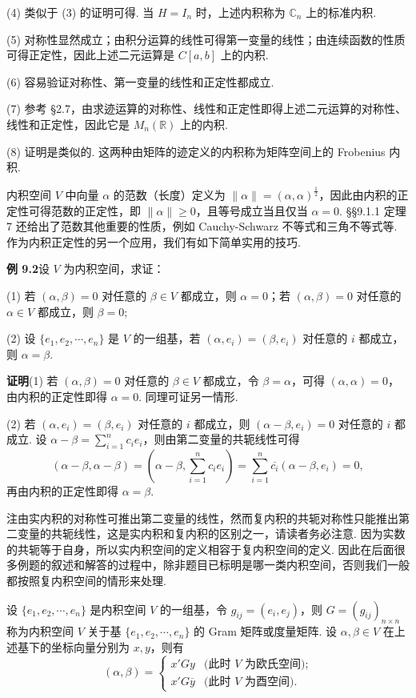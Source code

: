 \documentclass[UTF8,12pt,a4paper,fontset=fandol]{ctexart}
\begin{document}
(4) 类似于 (3) 的证明可得. 当 $H=I_n$ 时，上述内积称为 $\mathbb{C}_n$ 上的标准内积.

(5) 对称性显然成立；由积分运算的线性可得第一变量的线性；由连续函数的性质可得正定性，因此上述二元运算是 $C[a,b]$ 上的内积.

(6) 容易验证对称性、第一变量的线性和正定性都成立.

(7) 参考 §2.7，由求迹运算的对称性、线性和正定性即得上述二元运算的对称性、线性和正定性，因此它是 $M_n(\mathbb{R})$ 上的内积.

(8) 证明是类似的. 这两种由矩阵的迹定义的内积称为矩阵空间上的 Frobenius 内积.

内积空间 $V$ 中向量 $\alpha$ 的范数（长度）定义为 $\|\alpha\|=(\alpha,\alpha)^{\frac12}$，因此由内积的正定性可得范数的正定性，即 $\|\alpha\|\ge 0$，且等号成立当且仅当 $\alpha=0$. §§9.1.1 定理 7 还给出了范数其他重要的性质，例如 Cauchy-Schwarz 不等式和三角不等式等. 作为内积正定性的另一个应用，我们有如下简单实用的技巧.

\noindent\textbf{例 9.2}\quad 设 $V$ 为内积空间，求证：

(1) 若 $(\alpha,\beta)=0$ 对任意的 $\beta\in V$ 都成立，则 $\alpha=0$；若 $(\alpha,\beta)=0$ 对任意的 $\alpha\in V$ 都成立，则 $\beta=0$;

(2) 设 $\{e_1,e_2,\cdots,e_n\}$ 是 $V$ 的一组基，若 $(\alpha,e_i)=(\beta,e_i)$ 对任意的 $i$ 都成立，则 $\alpha=\beta$.

\noindent\textbf{证明}\quad (1) 若 $(\alpha,\beta)=0$ 对任意的 $\beta\in V$ 都成立，令 $\beta=\alpha$，可得 $(\alpha,\alpha)=0$，由内积的正定性即得 $\alpha=0$. 同理可证另一情形.

(2) 若 $(\alpha,e_i)=(\beta,e_i)$ 对任意的 $i$ 都成立，则 $(\alpha-\beta,e_i)=0$ 对任意的 $i$ 都成立. 设 $\alpha-\beta=\sum_{i=1}^n c_ie_i$，则由第二变量的共轭线性可得
\[
(\alpha-\beta,\alpha-\beta)=\left(\alpha-\beta,\sum_{i=1}^n c_ie_i\right)
=\sum_{i=1}^n \overline{c_i}(\alpha-\beta,e_i)=0,
\]
再由内积的正定性即得 $\alpha=\beta$.

注\quad 由实内积的对称性可推出第二变量的线性，然而复内积的共轭对称性只能推出第二变量的共轭线性，这是实内积和复内积的区别之一，请读者务必注意. 因为实数的共轭等于自身，所以实内积空间的定义相容于复内积空间的定义. 因此在后面很多例题的叙述和解答的过程中，除非题目已标明是哪一类内积空间，否则我们一般都按照复内积空间的情形来处理.

设 $\{e_1,e_2,\cdots,e_n\}$ 是内积空间 $V$ 的一组基，令 $g_{ij}=(e_i,e_j)$，则 $G=(g_{ij})_{n\times n}$ 称为内积空间 $V$ 关于基 $\{e_1,e_2,\cdots,e_n\}$ 的 Gram 矩阵或度量矩阵. 设 $\alpha,\beta\in V$ 在上述基下的坐标向量分别为 $x,y$，则有
\begin{equation}
(\alpha,\beta)=
\begin{cases}
x'Gy & \text{(此时 $V$ 为欧氏空间);} \\
x'G\overline{y} & \text{(此时 $V$ 为酉空间).}
\end{cases}
\tag{9.2}
\end{equation}
\end{document}
